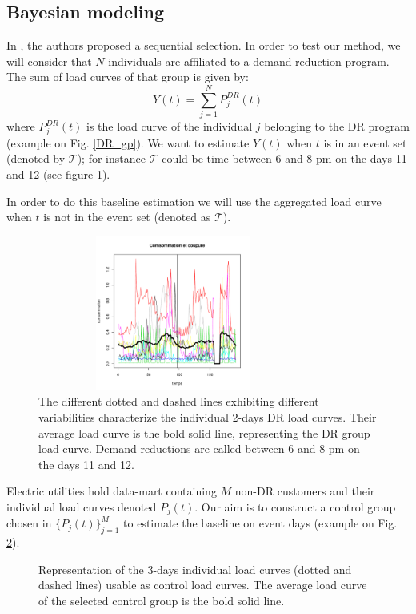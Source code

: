 \documentclass[journal]{IEEEtran}
\begin{document}
\subsection{Bayesian modeling}
In \cite{directestimation}, the authors proposed a sequential
selection.  In order to test our method, we will consider that $N$
individuals are affiliated to a demand reduction program. The sum of
load curves of that group is given by:
\begin{equation}\label{eq:DRcurve}
Y(t)=\sum_{j=1}^N P_j^{DR}(t)
\end{equation}
where $P_j^{DR}(t)$ is the load curve of the individual $j$ belonging
to the DR program (example on Fig. \ref{DR_gp}). We want to estimate
$Y(t)$ when $t$ is in an event set (denoted by $\mathcal{T}$); for instance $\mathcal{T}$ could be time
between 6 and 8 pm on the days 11 and 12 (see figure \ref{DR_gpe2}).

In order to do this baseline estimation we will use the aggregated
load curve when $t$ is not in the  event set (denoted as
$\bar{\mathcal{T}}$).
\begin{figure}[!h]
  \centering \includegraphics[width=3.5in,height=2in]{DR_gp}
\caption{{\scriptsize The different dotted and dashed lines exhibiting
    different variabilities characterize the individual 2-days DR load
    curves. Their average load curve is the bold solid line,
    representing the DR group load curve. Demand reductions are called
    between 6 and 8 pm on the days 11 and 12.}}
\label{DR_gpe2}
\end{figure}
Electric utilities hold data-mart containing $M$ non-DR customers and
their individual load curves denoted $P_j(t)$. Our aim is to
construct a control group chosen in $\{P_j(t)\}_{j=1}^M$ to
estimate the baseline on event days (example on Fig. \ref{CG_gpe2}).
\begin{figure}[!h]
\centering
\caption{{\scriptsize Representation of the 3-days individual load
    curves (dotted and dashed lines) usable as control load
    curves. The average load curve of the selected control group is
    the bold solid line.}}
\label{CG_gpe2}
\end{figure}
\end{document}
